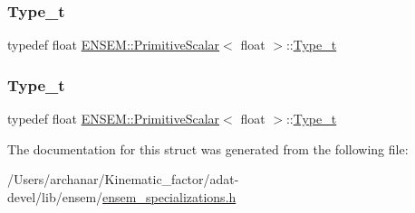 \mbox{\label{structENSEM_1_1PrimitiveScalar_3_01float_01_4_a227fd22d14a3854ff0e0afbf40a04433}} 
\subsubsection{\texorpdfstring{Type\_t}{Type\_t}\hspace{0.1cm}{\footnotesize\ttfamily [2/3]}}
{\footnotesize\ttfamily typedef float \mbox{\hyperlink{structENSEM_1_1PrimitiveScalar}{E\+N\+S\+E\+M\+::\+Primitive\+Scalar}}$<$ float $>$\+::\mbox{\hyperlink{structENSEM_1_1PrimitiveScalar_3_01float_01_4_a227fd22d14a3854ff0e0afbf40a04433}{Type\+\_\+t}}}

\mbox{\label{structENSEM_1_1PrimitiveScalar_3_01float_01_4_a227fd22d14a3854ff0e0afbf40a04433}} 
\subsubsection{\texorpdfstring{Type\_t}{Type\_t}\hspace{0.1cm}{\footnotesize\ttfamily [3/3]}}
{\footnotesize\ttfamily typedef float \mbox{\hyperlink{structENSEM_1_1PrimitiveScalar}{E\+N\+S\+E\+M\+::\+Primitive\+Scalar}}$<$ float $>$\+::\mbox{\hyperlink{structENSEM_1_1PrimitiveScalar_3_01float_01_4_a227fd22d14a3854ff0e0afbf40a04433}{Type\+\_\+t}}}



The documentation for this struct was generated from the following file\+:\begin{DoxyCompactItemize}
\item 
/\+Users/archanar/\+Kinematic\+\_\+factor/adat-\/devel/lib/ensem/\mbox{\hyperlink{adat-devel_2lib_2ensem_2ensem__specializations_8h}{ensem\+\_\+specializations.\+h}}\end{DoxyCompactItemize}
